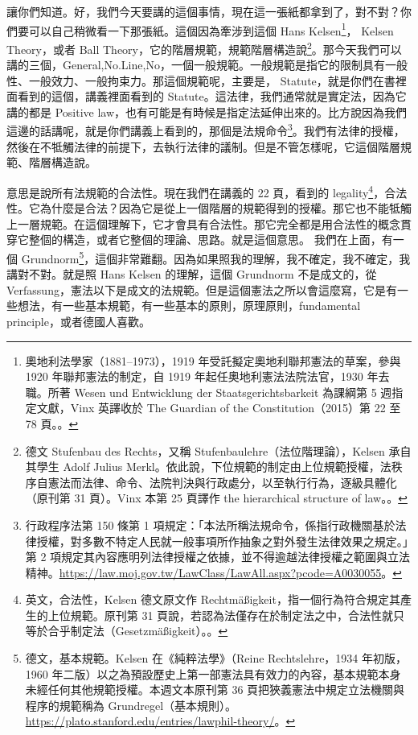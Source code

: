 \hypertarget{w05:cue:5}{}讓你們知道。好，我們今天要講的這個事情，現在這一張紙都拿到了，對不對？你們要可以自己稍微看一下那張紙。這個因為牽涉到這個 Hans Kelsen\footnote{奧地利法學家（1881–1973），1919 年受託擬定奧地利聯邦憲法的草案，參與 1920 年聯邦憲法的制定，自 1919 年起任奧地利憲法法院法官，1930 年去職。所著 Wesen und Entwicklung der Staatsgerichtsbarkeit 為課綱第 5 週指定文獻，Vinx 英譯收於 The Guardian of the Constitution（2015）第 22 至 78 頁。\cite{kelsen2015}。}，
\hypertarget{w05:cue:6}{}Kelsen Theory，或者 Ball Theory，它的階層規範，規範階層構造說\footnote{德文 Stufenbau des Rechts，又稱 Stufenbaulehre（法位階理論），Kelsen 承自其學生 Adolf Julius Merkl。依此說，下位規範的制定由上位規範授權，法秩序自憲法而法律、命令、法院判決與行政處分，以至執行行為，逐級具體化（原刊第 31 頁）。Vinx 本第 25 頁譯作 the hierarchical structure of law。\cite[31]{kelsen1929}。}。那今天我們可以講的三個，General,No.Line,No，一個一般規範。一般規範是指它的限制具有一般性、一般效力、一般拘束力。那這個規範呢，主要是，
\hypertarget{w05:cue:7}{}Statute，就是你們在書裡面看到的這個，講義裡面看到的 Statute。這法律，我們通常就是實定法，因為它講的都是 Positive law，也有可能是有時候是指定法延伸出來的。比方說因為我們這邊的話講呢，就是你們講義上看到的，那個是法規命令\footnote{行政程序法第 150 條第 1 項規定：「本法所稱法規命令，係指行政機關基於法律授權，對多數不特定人民就一般事項所作抽象之對外發生法律效果之規定。」第 2 項規定其內容應明列法律授權之依據，並不得逾越法律授權之範圍與立法精神。\url{https://law.moj.gov.tw/LawClass/LawAll.aspx?pcode=A0030055}。}。我們有法律的授權，然後在不牴觸法律的前提下，去執行法律的議制。但是不管怎樣呢，它這個階層規範、階層構造說。

\hypertarget{w05:cue:8}{}意思是說所有法規範的合法性。現在我們在講義的 22 頁，看到的 legality\footnote{英文，合法性，Kelsen 德文原文作 Rechtmäßigkeit，指一個行為符合規定其產生的上位規範。原刊第 31 頁說，若認為法僅存在於制定法之中，合法性就只等於合乎制定法（Gesetzmäßigkeit）。\cite[31]{kelsen1929}。}，合法性。它為什麼是合法？因為它是從上一個階層的規範得到的授權。那它也不能牴觸上一層規範。在這個理解下，它才會具有合法性。那它完全都是用合法性的概念貫穿它整個的構造，或者它整個的理論、思路。就是這個意思。
\hypertarget{w05:cue:9}{}我們在上面，有一個 Grundnorm\footnote{德文，基本規範。Kelsen 在《純粹法學》（Reine Rechtslehre，1934 年初版，1960 年二版）以之為預設歷史上第一部憲法具有效力的內容，基本規範本身未經任何其他規範授權。本週文本原刊第 36 頁把狹義憲法中規定立法機關與程序的規範稱為 Grundregel（基本規則）。\url{https://plato.stanford.edu/entries/lawphil-theory/}。}，這個非常難翻。因為如果照我的理解，我不確定，我不確定，我講對不對。就是照 Hans Kelsen 的理解，這個 Grundnorm 不是成文的，從 Verfassung，憲法以下是成文的法規範。但是這個憲法之所以會這麼寫，它是有一些想法，有一些基本規範，有一些基本的原則，原理原則，fundamental principle，或者德國人喜歡。

